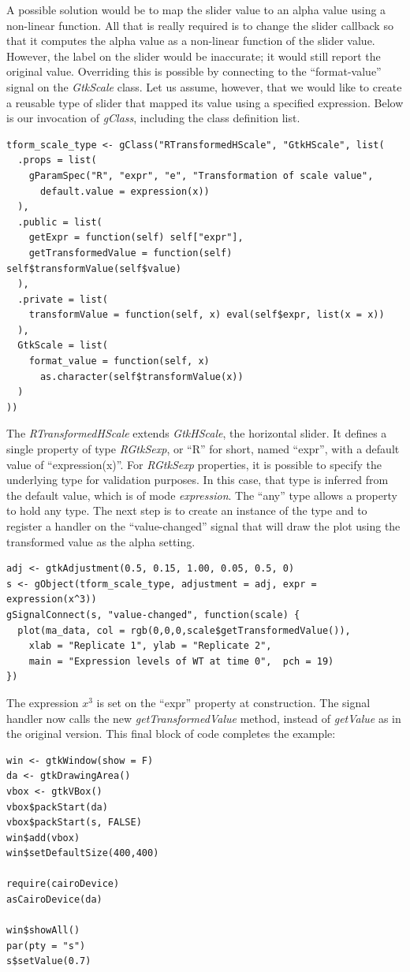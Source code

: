 \documentclass[article]{jss}
\begin{document}
A possible solution would be to map the slider value to an alpha value using a 
non-linear function. All that is
really required is to change the slider callback so that it computes the
alpha value as a non-linear function of the slider value. However, the 
label on the slider would be inaccurate; it would still report the original value.
Overriding this is possible by connecting to the ``format-value'' signal on
the \emph{GtkScale} class. Let us assume, however, that we would like to create
a reusable type of slider that mapped its value using a specified  expression.
Below is our invocation of \emph{gClass}, including the class definition list.
\begin{verbatim}
tform_scale_type <- gClass("RTransformedHScale", "GtkHScale", list(
  .props = list(
    gParamSpec("R", "expr", "e", "Transformation of scale value",
      default.value = expression(x))
  ),
  .public = list(
    getExpr = function(self) self["expr"],
    getTransformedValue = function(self) self$transformValue(self$value)
  ),
  .private = list(
    transformValue = function(self, x) eval(self$expr, list(x = x))
  ),
  GtkScale = list(
    format_value = function(self, x)
      as.character(self$transformValue(x))
  )
))
\end{verbatim}
The \emph{RTransformedHScale} extends \emph{GtkHScale}, the horizontal slider.
It defines a single property of type \emph{RGtkSexp}, or ``R'' for short, named
``expr'', with a default value of ``expression(x)''. For \emph{RGtkSexp}
properties, it is possible to specify the underlying  type for
validation purposes. In this case, that type is inferred from the default
value, which is of mode \emph{expression}. The ``any'' type allows a property
to hold any  type. The next step is to create an instance
of the type and to register a handler on the ``value-changed'' signal that
will draw the plot using the transformed value as the alpha setting.
\begin{verbatim}
adj <- gtkAdjustment(0.5, 0.15, 1.00, 0.05, 0.5, 0)
s <- gObject(tform_scale_type, adjustment = adj, expr = expression(x^3))
gSignalConnect(s, "value-changed", function(scale) {
  plot(ma_data, col = rgb(0,0,0,scale$getTransformedValue()),
    xlab = "Replicate 1", ylab = "Replicate 2", 
    main = "Expression levels of WT at time 0",  pch = 19)
})
\end{verbatim}
The expression $x^3$ is set on the ``expr'' property at construction. The
signal handler now calls the new \emph{getTransformedValue} method, instead
of \emph{getValue} as in the original version. This final block of code
completes the example:
\begin{verbatim}
win <- gtkWindow(show = F)
da <- gtkDrawingArea()
vbox <- gtkVBox()
vbox$packStart(da)
vbox$packStart(s, FALSE)
win$add(vbox)
win$setDefaultSize(400,400)

require(cairoDevice)
asCairoDevice(da)

win$showAll()
par(pty = "s")
s$setValue(0.7)
\end{verbatim}
\end{document}
